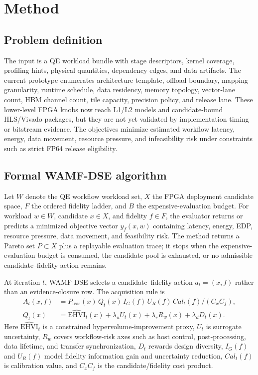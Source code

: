 \documentclass[sigconf,anonymous,review]{acmart}
\begin{document}
\section{Method}

\subsection{Problem definition}

The input is a QE workload bundle with stage descriptors, kernel coverage, profiling hints, physical quantities, dependency edges, and data artifacts.  The current prototype enumerates architecture template, offload boundary, mapping granularity, runtime schedule, data residency, memory topology, vector-lane count, HBM channel count, tile capacity, precision policy, and release lane.  These lower-level FPGA knobs now reach L1/L2 models and candidate-bound HLS/Vivado packages, but they are not yet validated by implementation timing or bitstream evidence.  The objectives minimize estimated workflow latency, energy, data movement, resource pressure, and infeasibility risk under constraints such as strict FP64 release eligibility.

\subsection{Formal WAMF-DSE algorithm}

Let $W$ denote the QE workflow workload set, $X$ the FPGA deployment candidate space, $F$ the ordered fidelity ladder, and $B$ the expensive-evaluation budget.  For workload $w\in W$, candidate $x\in X$, and fidelity $f\in F$, the evaluator returns or predicts a minimized objective vector $y_f(x,w)$ containing latency, energy, EDP, resource pressure, data movement, and feasibility risk.  The method returns a Pareto set $P\subset X$ plus a replayable evaluation trace; it stops when the expensive-evaluation budget is consumed, the candidate pool is exhausted, or no admissible candidate--fidelity action remains.

At iteration $t$, WAMF-DSE selects a candidate--fidelity action $a_t=(x,f)$ rather than an evidence-closure row.  The acquisition rule is
\begin{align*}
A_t(x,f) &= P_{\mathrm{feas}}(x)\, Q_t(x)\, I_G(f)\, U_R(f)\, Cal_t(f)/(C_x C_f),\\
Q_t(x) &= \widehat{\mathrm{EHVI}}_t(x)+\lambda_u U_t(x)+\lambda_r R_w(x)+\lambda_d D_t(x).
\end{align*}
Here $\widehat{\mathrm{EHVI}}_t$ is a constrained hypervolume-improvement proxy, $U_t$ is surrogate uncertainty, $R_w$ covers workflow-risk axes such as host control, post-processing, data lifetime, and transfer synchronization, $D_t$ rewards design diversity, $I_G(f)$ and $U_R(f)$ model fidelity information gain and uncertainty reduction, $Cal_t(f)$ is calibration value, and $C_x C_f$ is the candidate/fidelity cost product.
\end{document}
